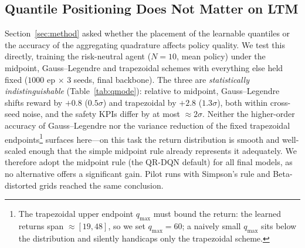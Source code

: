 \documentclass[conference]{IEEEtran}
\begin{document}
\subsection{Quantile Positioning Does Not Matter on LTM}
\label{sec:results-qmode}
Section~\ref{sec:method} asked whether the placement of the learnable quantiles
or the accuracy of the aggregating quadrature affects policy quality. We test
this directly, training the risk-neutral agent ($N{=}10$, mean policy) under the
midpoint, Gauss--Legendre and trapezoidal schemes with everything else held
fixed ($1000$ ep $\times$ $3$ seeds, final backbone). The three are
\emph{statistically indistinguishable} (Table~\ref{tab:qmode}): relative to
midpoint, Gauss--Legendre shifts reward by $+0.8$ ($0.5\sigma$) and trapezoidal
by $+2.8$ ($1.3\sigma$), both within cross-seed noise, and the safety KPIs
differ by at most ${\approx}2\sigma$. Neither the higher-order accuracy of
Gauss--Legendre nor the variance reduction of the fixed trapezoidal
endpoints\footnote{The trapezoidal upper endpoint $q_{\max}$ must bound the
return: the learned returns span ${\approx}[19,48]$, so we set $q_{\max}{=}60$;
a naively small $q_{\max}$ sits below the distribution and silently handicaps
only the trapezoidal scheme.} surfaces here---on this task the return
distribution is smooth and well-scaled enough that the simple midpoint rule
already represents it adequately. We therefore adopt the midpoint rule (the
QR-DQN default) for all final models, as no alternative offers a significant
gain. Pilot runs with Simpson's rule and Beta-distorted grids reached the same
conclusion.
\end{document}
